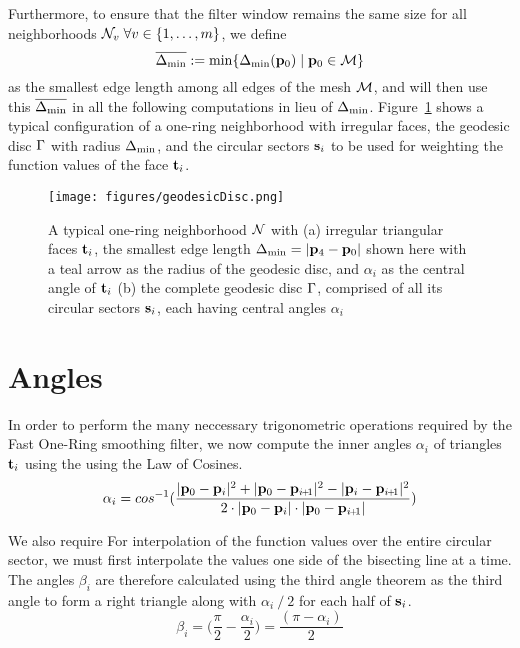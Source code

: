 Furthermore, to ensure that the filter window remains the same size for all neighborhoods $\mathcal{N}_v\;\forall v \in \{1,\ldots,m\}$, we define
\begin{equation}
	\overline{\Delta_\text{min}} := \min\{\Delta_\text{min}(\mathbf{p}_0) \;|\; \mathbf{p}_0 \in \mathcal{M}\}
	\label{eq:globalMinimumEdgeLength}
\end{equation}%
%
%
as the smallest edge length among all edges of the mesh $\mathcal{M}$, and will then use this $\overline{\Delta_\text{min}}$ in all the following computations in lieu of $\Delta_\text{min}$.
%
Figure~\ref{fig:geodesicDisc} shows a typical configuration of a one-ring neighborhood with irregular faces, the geodesic disc $\Gamma$ with radius $\Delta_\text{min}$, and the circular sectors $\mathbf{s}_i$ to be used for weighting the function values of the face $\mathbf{t}_i$.
\begin{figure}[ht]
\ffigbox
	{\texttt{[image: figures/geodesicDisc.png]}}
	{\caption[One-ring and geodesic disc]{A typical one-ring neighborhood $\mathcal{N}$ with (a) irregular triangular faces $\mathbf{t}_i$, the smallest edge length $\Delta_\text{min} = |\mathbf{p}_4 - \mathbf{p}_0|$ shown here with a teal arrow as the radius of the geodesic disc, and $\alpha_i$ as the central angle of $\mathbf{t}_i$ (b) the complete geodesic disc $\Gamma$, comprised of all its circular sectors $\mathbf{s}_i$, each having central angles $\alpha_i$}\label{fig:geodesicDisc}}
\end{figure}%
%
%
%
%
\section{Angles}
\label{cFONSsA}
In order to perform the many neccessary trigonometric operations required by the Fast One-Ring smoothing filter, we now compute the inner angles $\alpha_i$ of triangles $\mathbf{t}_i$ using the using the Law of Cosines. 
\begin{equation}
	\alpha_i = cos^{-1}(\frac{|\bp_0 - \bp_{i}|^2 + |\bp_0 - \bp_{\sipo}|^2 - |\bp_i - \bp_{\sipo}|^2}{2\cdot|\bp_0 - \bp_{i}|\cdot|\bp_0 - \bp_{\sipo}|})
	\label{eq:alphaFromEdgeLengths}
\end{equation}%
%

We also require For interpolation of the function values over the entire circular sector, we must first interpolate the values one side of the bisecting line at a time. The angles $\beta_i$ are therefore calculated using the third angle theorem as the third angle to form a right triangle along with $\alpha_i\mathbin{/}2$ for each half of $\mathbf{s}_i$. 
\begin{equation}
	\beta_i = \Big(\frac{\pi}{2} - \frac{\alpha_i}{2}\Big) = \frac{(\pi - \alpha_i)}{2}
	\label{eq:betaFromHalfAlpha}
\end{equation}%
%
%
